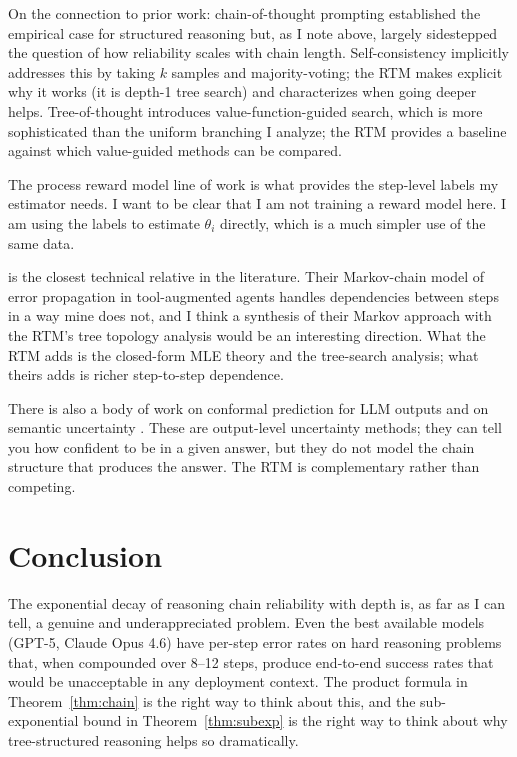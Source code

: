 \documentclass[11pt]{article}
\theoremstyle{plain}
\theoremstyle{definition}
\begin{document}
On the connection to prior work: chain-of-thought prompting
\citep{wei2022chain, kojima2022large} established the empirical case for
structured reasoning but, as I note above, largely sidestepped the question
of how reliability scales with chain length. Self-consistency \citep{wang2022self}
implicitly addresses this by taking $k$ samples and majority-voting; the RTM
makes explicit why it works (it is depth-1 tree search) and characterizes when
going deeper helps. Tree-of-thought \citep{yao2023tree} introduces
value-function-guided search, which is more sophisticated than the uniform
branching I analyze; the RTM provides a baseline against which value-guided
methods can be compared.

The process reward model line of work \citep{lightman2023let} is what provides
the step-level labels my estimator needs. I want to be clear that I am not
training a reward model here. I am using the labels to estimate $\theta_i$
directly, which is a much simpler use of the same data.

\citet{li2024cascade} is the closest technical relative in the literature. Their
Markov-chain model of error propagation in tool-augmented agents handles
dependencies between steps in a way mine does not, and I think a synthesis of
their Markov approach with the RTM's tree topology analysis would be an
interesting direction. What the RTM adds is the closed-form MLE theory and the
tree-search analysis; what theirs adds is richer step-to-step dependence.

There is also a body of work on conformal prediction for LLM outputs
\citep{angelopoulos2023conformal, quach2023conformal} and on semantic
uncertainty \citep{kuhn2023semantic}. These are output-level uncertainty
methods; they can tell you how confident to be in a given answer, but they
do not model the chain structure that produces the answer. The RTM is
complementary rather than competing.

\section{Conclusion}
\label{sec:conclusion}

The exponential decay of reasoning chain reliability with depth is, as far as
I can tell, a genuine and underappreciated problem. Even the best available
models (GPT-5, Claude Opus 4.6) have per-step error rates on hard
reasoning problems that, when compounded over 8--12 steps, produce end-to-end
success rates that would be unacceptable in any deployment context. The
product formula in Theorem~\ref{thm:chain} is the right way to think about
this, and the sub-exponential bound in Theorem~\ref{thm:subexp} is the
right way to think about why tree-structured reasoning helps so dramatically.
\end{document}
